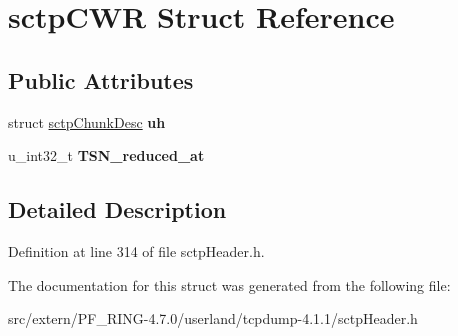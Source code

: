 \hypertarget{structsctp_c_w_r}{
\section{sctpCWR Struct Reference}
\label{structsctp_c_w_r}
}
\subsection*{Public Attributes}
\begin{DoxyCompactItemize}
\item 
\hypertarget{structsctp_c_w_r_a0a393334e59705c15ebbd48286c38dfb}{
struct \hyperlink{structsctp_chunk_desc}{sctpChunkDesc} {\bfseries uh}}
\label{structsctp_c_w_r_a0a393334e59705c15ebbd48286c38dfb}

\item 
\hypertarget{structsctp_c_w_r_ad42a1f20f886ea7b07175ed079057f14}{
u\_\-int32\_\-t {\bfseries TSN\_\-reduced\_\-at}}
\label{structsctp_c_w_r_ad42a1f20f886ea7b07175ed079057f14}

\end{DoxyCompactItemize}


\subsection{Detailed Description}


Definition at line 314 of file sctpHeader.h.



The documentation for this struct was generated from the following file:\begin{DoxyCompactItemize}
\item 
src/extern/PF\_\-RING-\/4.7.0/userland/tcpdump-\/4.1.1/sctpHeader.h\end{DoxyCompactItemize}
